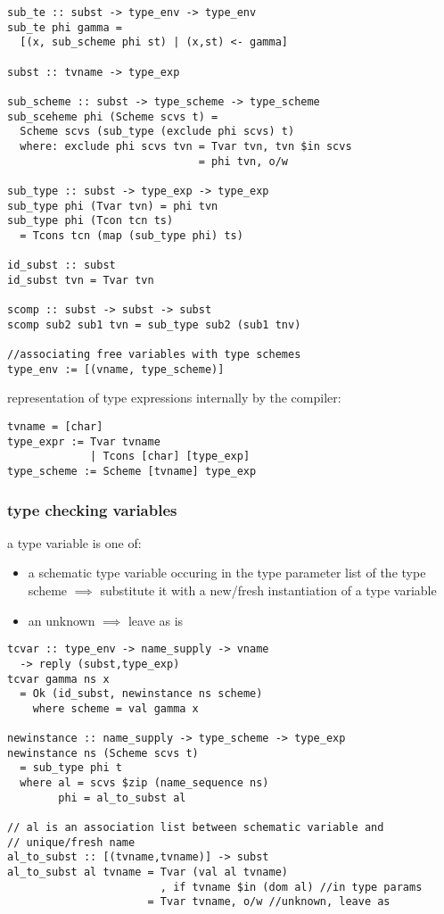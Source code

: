\documentclass[8pt]{extarticle}
\begin{document}
\begin{multicols*}{2}
\begin{verbatim}
sub_te :: subst -> type_env -> type_env
sub_te phi gamma =
  [(x, sub_scheme phi st) | (x,st) <- gamma]

subst :: tvname -> type_exp

sub_scheme :: subst -> type_scheme -> type_scheme
sub_sceheme phi (Scheme scvs t) =
  Scheme scvs (sub_type (exclude phi scvs) t)
  where: exclude phi scvs tvn = Tvar tvn, tvn $in scvs
                              = phi tvn, o/w

sub_type :: subst -> type_exp -> type_exp
sub_type phi (Tvar tvn) = phi tvn
sub_type phi (Tcon tcn ts)
  = Tcons tcn (map (sub_type phi) ts)

id_subst :: subst
id_subst tvn = Tvar tvn

scomp :: subst -> subst -> subst
scomp sub2 sub1 tvn = sub_type sub2 (sub1 tnv)

//associating free variables with type schemes
type_env := [(vname, type_scheme)]
\end{verbatim} 

representation of type expressions internally by the compiler:
\begin{verbatim}
tvname = [char]
type_expr := Tvar tvname
             | Tcons [char] [type_exp]
type_scheme := Scheme [tvname] type_exp
\end{verbatim}

\subsubsection{type checking variables}
a type variable is one of:
\begin{itemize}
\item a schematic type variable occuring in the type parameter list of the type scheme $\implies$ substitute it with a new/fresh instantiation of a type variable
\item an unknown $\implies$ leave as is
\end{itemize}

\begin{verbatim}
tcvar :: type_env -> name_supply -> vname
  -> reply (subst,type_exp)
tcvar gamma ns x
  = Ok (id_subst, newinstance ns scheme)
    where scheme = val gamma x

newinstance :: name_supply -> type_scheme -> type_exp
newinstance ns (Scheme scvs t)
  = sub_type phi t
  where al = scvs $zip (name_sequence ns)
        phi = al_to_subst al

// al is an association list between schematic variable and
// unique/fresh name
al_to_subst :: [(tvname,tvname)] -> subst
al_to_subst al tvname = Tvar (val al tvname)
                        , if tvname $in (dom al) //in type params
                      = Tvar tvname, o/w //unknown, leave as
\end{verbatim}


\end{multicols*}
\end{document}
